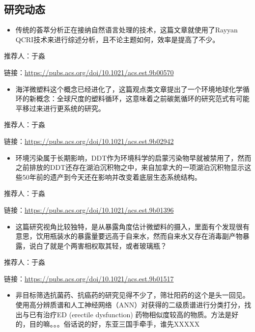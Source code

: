 \documentclass[
]{book}
\providecommand{\tightlist}{%
  \setlength{\itemsep}{0pt}\setlength{\parskip}{0pt}}
\begin{document}
\hypertarget{ux7814ux7a76ux52a8ux6001-19}{%
\subsection*{研究动态}\label{ux7814ux7a76ux52a8ux6001-19}}

\begin{itemize}
\tightlist
\item
  传统的荟萃分析正在接纳自然语言处理的技术，这篇文章就使用了Rayyan QCRI技术来进行综述分析，且不论主题如何，效率是提高了不少。
\end{itemize}

推荐人：于淼

链接：\url{https://pubs.acs.org/doi/10.1021/acs.est.9b00570}

\begin{itemize}
\tightlist
\item
  海洋微塑料这个概念已经进化了，这篇观点类文章提出了一个环境地球化学循环的新概念：全球尺度的塑料循环，这意味着之前碳氮循环的研究范式有可能平移过来进行更系统的研究。
\end{itemize}

推荐人：于淼

链接：\url{https://pubs.acs.org/doi/10.1021/acs.est.9b02942}

\begin{itemize}
\tightlist
\item
  环境污染属于长期影响，DDT作为环境科学的启蒙污染物早就被禁用了，然而之前排放的DDT还存在湖泊沉积物之中，来自加拿大的一项湖泊沉积物显示这些50年前的遗产到今天还在影响并改变着底层生态系统结构。
\end{itemize}

推荐人：于淼

链接：\url{https://pubs.acs.org/doi/10.1021/acs.est.9b01396}

\begin{itemize}
\tightlist
\item
  这篇研究视角比较独特，是从暴露角度估计微塑料的摄入，里面有个发现很有意思，饮用瓶装水的暴露量要远高于自来水，然而自来水又存在消毒副产物暴露，说白了就是个两害相权取其轻，或者玻璃瓶？
\end{itemize}

推荐人：于淼

链接：\url{https://pubs.acs.org/doi/10.1021/acs.est.9b01517}

\begin{itemize}
\tightlist
\item
  非目标筛选抗菌药、抗癌药的研究见得不少了，筛壮阳药的这个是头一回见。使用高分辨质谱和人工神经网络（ANN）对获得的二级质谱进行分类打分，找出与已有治疗ED (erectile dysfunction) 药物相似度较高的物质。方法是好的，目的嘛。。。俗话说的好，东亚三国手牵手，谁先XXXXX
\end{itemize}
\end{document}
